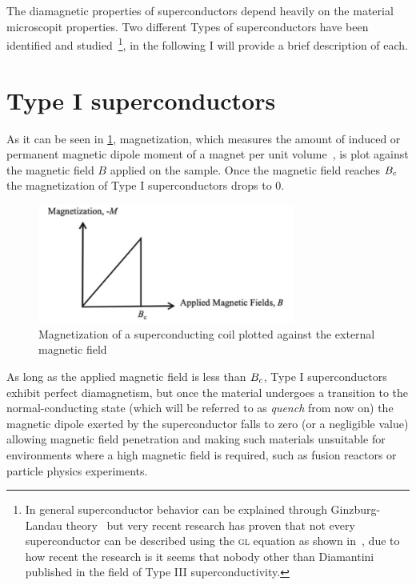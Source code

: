 The diamagnetic properties of superconductors depend heavily on the material microscopit properties. Two different Types of superconductors have been
identified and studied~\footnote{In general superconductor behavior can be explained through
	Ginzburg-Landau theory~\cite{Cyrot1973} but very recent research has proven that not every
	superconductor can be described using the \textsc{gl} equation as shown in~\cite{diamantini2023typeiiisuperconductivity}, due to how recent the research is it seems that nobody other than Diamantini published in the field of Type III superconductivity.
}, in the following I will provide a brief description of each.

\section{Type I superconductors}
\label{sec:type1}
As it can be seen in \cref{img:type1-transition}, magnetization, which measures the amount of induced or
permanent magnetic dipole moment of a magnet per unit volume~\cite{polarization-magnetization}, is
plot against the magnetic field $B$ applied on the sample. Once the magnetic field reaches $B_c$ the
magnetization of Type I superconductors drops to $0$.
\begin{figure}
	\centering
	\includegraphics[width=0.75\textwidth]{./img/type1.png}
	\caption{Magnetization of a superconducting coil plotted against the external magnetic
		field~\cite{slimani2022superconducting}}
	\label{img:type1-transition}
\end{figure}
As long as the applied magnetic field is less than $B_c$, Type I superconductors exhibit perfect
diamagnetism, but once the material undergoes a transition to the normal-conducting
state (which will be referred to as \emph{quench} from now on) the magnetic dipole exerted by the
superconductor falls to zero (or a negligible value) allowing magnetic field penetration and making
such materials unsuitable for environments where a high magnetic field is required, such as fusion
reactors or particle physics experiments.

